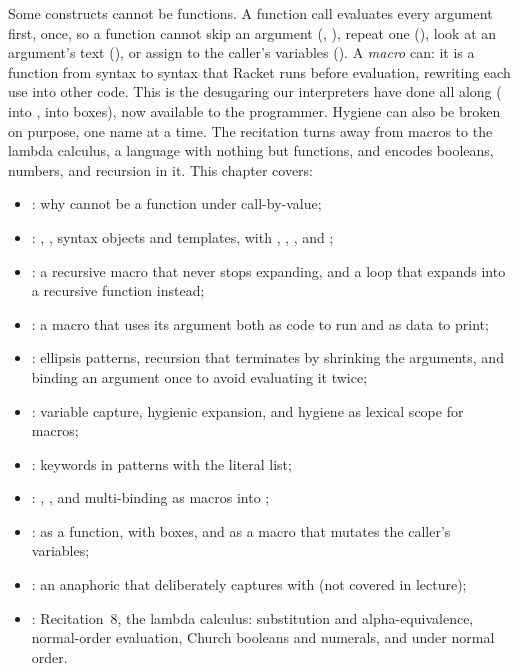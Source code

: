 Some constructs cannot be functions. A function call evaluates every argument first, once, so a function cannot skip an argument (, ), repeat one (), look at an argument's text (), or assign to the caller's variables (). A \emph{macro} can: it is a function from syntax to syntax that Racket runs before evaluation, rewriting each use into other code. This is the desugaring our interpreters have done all along ( into ,  into boxes), now available to the programmer. Hygiene can also be broken on purpose, one name at a time. The recitation turns away from macros to the lambda calculus, a language with nothing but functions, and encodes booleans, numbers, and recursion in it. This chapter covers:
\begin{itemize}
  \item {}: why  cannot be a function under call-by-value;
  \item {}: , , syntax objects and  templates, with , , , and ;
  \item {}: a recursive macro that never stops expanding, and a  loop that expands into a recursive function instead;
  \item {}: a macro that uses its argument both as code to run and as data to print;
  \item {}: ellipsis patterns, recursion that terminates by shrinking the arguments, and binding an argument once to avoid evaluating it twice;
  \item {}: variable capture, hygienic expansion, and hygiene as lexical scope for macros;
  \item {}: keywords in patterns with the literal list;
  \item {}: , , and multi-binding  as macros into ;
  \item {}:  as a function, with boxes, and as a macro that mutates the caller's variables;
  \item {}: an anaphoric  that deliberately captures  with  (not covered in lecture);
  \item {}: Recitation~8, the lambda calculus: substitution and alpha-equivalence, normal-order evaluation, Church booleans and numerals, and  under normal order.
\end{itemize}












